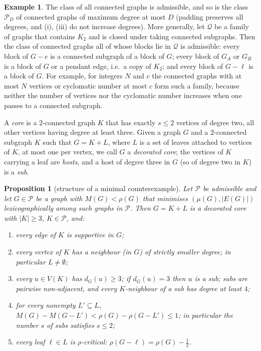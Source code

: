 \documentclass[11pt]{amsart}
\newtheorem{proposition}[theorem]{Proposition}
\theoremstyle{definition}
\newtheorem{example}[theorem]{Example}
\begin{document}
\begin{example}\label{ex:admissible}
The class of all connected graphs is admissible, and so is the class $\mathcal P_D$ of connected graphs of maximum
degree at most $D$ (padding preserves all degrees, and (i), (iii) do not increase degrees). More generally, let
$\mathcal Q$ be a family of graphs that contains $K_2$ and is closed under taking connected subgraphs. Then the class
of connected graphs all of whose blocks lie in $\mathcal Q$ is admissible: every block of $G-e$ is a connected subgraph
of a block of $G$; every block of $G_A$ or $G_B$ is a block of $G$ or a pendant edge, i.e.\ a copy of $K_2$; and every
block of $G-\ell$ is a block of $G$. For example, for integers $N$ and $c$ the connected graphs with at most $N$
vertices or cyclomatic number at most $c$ form such a family, because neither the number of vertices nor the
cyclomatic number increases when one passes to a connected subgraph.
\end{example}

A \emph{core} is a $2$-connected graph $K$ that has exactly $s\le2$ vertices of degree two, all other vertices having
degree at least three. Given a graph $G$ and a $2$-connected subgraph $K$ such that $G=K+L$, where $L$ is a set of
leaves attached to vertices of $K$, at most one per vertex, we call $G$ a \emph{decorated core}; the vertices of $K$
carrying a leaf are \emph{hosts}, and a host of degree three in $G$ (so of degree two in $K$) is a \emph{sub}.

\begin{proposition}[structure of a minimal counterexample]\label{prop:structure}
Let $\mathcal P$ be admissible and let $G\in\mathcal P$ be a graph with $M(G)<\rho(G)$ that minimises
$(\mu(G),|E(G)|)$ lexicographically among such graphs in $\mathcal P$. Then $G=K+L$ is a decorated core
with $|K|\ge3$, $K\in\mathcal P$, and:
\begin{enumerate}[label=(\alph*)]
\item every edge of $K$ is supportive in $G$;
\item every vertex of $K$ has a neighbour (in $G$) of strictly smaller degree; in particular $L\neq\emptyset$;
\item every $u\in V(K)$ has $d_G(u)\ge3$; if $d_G(u)=3$ then $u$ is a sub; subs are pairwise non-adjacent, and every
      $K$-neighbour of a sub has degree at least $4$;
\item for every nonempty $L'\subseteq L$, \ $M(G)-M(G-L')<\rho(G)-\rho(G-L')\le1$; in particular the number $s$ of
      subs satisfies $s\le2$;
\item every leaf $\ell\in L$ is $\rho$-critical: $\rho(G-\ell)=\rho(G)-\frac12$.
\end{enumerate}
\end{proposition}
\end{document}
